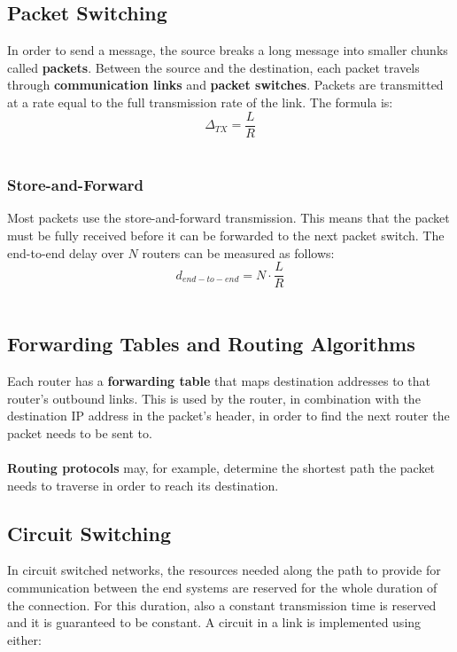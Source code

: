 \documentclass{article}
\begin{document}
\subsection{Packet Switching}
In order to send a message, the source breaks a long message into smaller chunks called \textbf{packets}. Between the source and the destination, each packet travels through \textbf{communication links} and \textbf{packet switches}. Packets are transmitted at a rate equal to the full transmission rate of the link. The formula is: \\

	\[ \Delta_{TX} = \frac{L}{R} \] \
	
\subsubsection{Store-and-Forward}
Most packets use the store-and-forward transmission. This means that the packet must be fully received before it can be forwarded to the next packet switch. The end-to-end delay over $N$ routers can be measured as follows: \\

	\[ d_{end-to-end} = N \cdot \frac{L}{R} \] \
	
\subsection{Forwarding Tables and Routing Algorithms}
Each router has a \textbf{forwarding table} that maps destination addresses to that router's outbound links. This is used by the router, in combination with the destination IP address in the packet's header, in order to find the next router the packet needs to be sent to. \\ \\
\textbf{Routing protocols} may, for example, determine the shortest path the packet needs to traverse in order to reach its destination.

\subsection{Circuit Switching}
In circuit switched networks, the resources needed along the path to provide for communication between the end systems are reserved for the whole duration of the connection. For this duration, also a constant transmission time is reserved and it is guaranteed to be constant. A circuit in a link is implemented using either:
\end{document}
